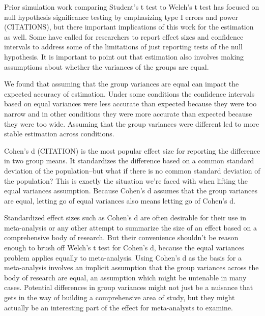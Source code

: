 \documentclass[man,a4paper,noextraspace,apacite]{apa6}
\begin{document}
    Prior simulation work comparing Student's t test to Welch's t test has focused on null hypothesis significance testing by emphasizing type I errors and power (CITATIONS), but there important implications of this work for the estimation as well. Some have called for researchers to report effect sizes and confidence intervals to address some of the limitations of just reporting tests of the null hypothesis. It is important to point out that estimation also involves making assumptions about whether the variances of the groups are equal.
    
    We found that assuming that the group variances are equal can impact the expected accuracy of estimation. Under some conditions the confidence intervals based on equal variances were less accurate than expected because they were too narrow and in other conditions they were more accurate than expected because they were too wide. Assuming that the group variances were different led to more stable estimation across conditions.
    
    Cohen's d (CITATION) is the most popular effect size for reporting the difference in two group means. It standardizes the difference based on a common standard deviation of the population--but what if there is no common standard deviation of the population? This is exactly the situation we're faced with when lifting the equal variances assumption. Because Cohen's d assumes that the group variances are equal, letting go of equal variances also means letting go of Cohen's d. 
    
    Standardized effect sizes such as Cohen's d are often desirable for their use in meta-analysis or any other attempt to summarize the size of an effect based on a comprehensive body of research. But their convenience shouldn't be reason enough to brush off Welch's t test for Cohen's d, because the equal variances problem applies equally to meta-analysis. Using Cohen's d as the basis for a meta-analysis involves an implicit assumption that the group variances across the body of research are equal, an assumption which might be untenable in many cases. Potential differences in group variances might not just be a nuisance that gets in the way of building a comprehensive area of study, but they might actually be an interesting part of the effect for meta-analysts to examine. 
    
\end{document}
